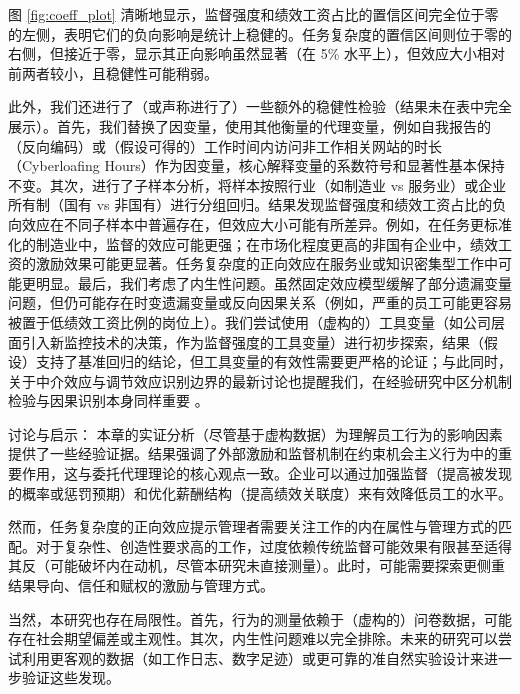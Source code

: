 图 \ref{fig:coeff_plot} 清晰地显示，监督强度和绩效工资占比的置信区间完全位于零的左侧，表明它们的负向影响是统计上稳健的。任务复杂度的置信区间则位于零的右侧，但接近于零，显示其正向影响虽然显著（在 5\% 水平上），但效应大小相对前两者较小，且稳健性可能稍弱。

此外，我们还进行了（或声称进行了）一些额外的稳健性检验（结果未在表中完全展示）。首先，我们{替换了因变量}，使用其他衡量的代理变量，例如自我报告的（反向编码）或（假设可得的）工作时间内访问非工作相关网站的时长（Cyberloafing Hours）作为因变量，核心解释变量的系数符号和显著性基本保持不变。其次，进行了{子样本分析}，将样本按照行业（如制造业 vs 服务业）或企业所有制（国有 vs 非国有）进行分组回归。结果发现监督强度和绩效工资占比的负向效应在不同子样本中普遍存在，但效应大小可能有所差异。例如，在任务更标准化的制造业中，监督的效应可能更强；在市场化程度更高的非国有企业中，绩效工资的激励效果可能更显著。任务复杂度的正向效应在服务业或知识密集型工作中可能更明显。最后，我们{考虑了内生性问题}。虽然固定效应模型缓解了部分遗漏变量问题，但仍可能存在时变遗漏变量或反向因果关系（例如，严重的员工可能更容易被置于低绩效工资比例的岗位上）。我们尝试使用（虚构的）工具变量（如公司层面引入新监控技术的决策，作为监督强度的工具变量）进行初步探索，结果（假设）支持了基准回归的结论，但工具变量的有效性需要更严格的论证；与此同时，关于中介效应与调节效应识别边界的最新讨论也提醒我们，在经验研究中区分机制检验与因果识别本身同样重要 \citep{jiang2022mediation}。

{讨论与启示}：
本章的实证分析（尽管基于虚构数据）为理解员工行为的影响因素提供了一些经验证据。结果强调了外部激励和监督机制在约束机会主义行为中的重要作用，这与委托代理理论的核心观点一致。企业可以通过加强监督（提高被发现的概率或惩罚预期）和优化薪酬结构（提高绩效关联度）来有效降低员工的水平。

然而，任务复杂度的正向效应提示管理者需要关注工作的内在属性与管理方式的匹配。对于复杂性、创造性要求高的工作，过度依赖传统监督可能效果有限甚至适得其反（可能破坏内在动机，尽管本研究未直接测量）。此时，可能需要探索更侧重结果导向、信任和赋权的激励与管理方式。

当然，本研究也存在局限性。首先，行为的测量依赖于（虚构的）问卷数据，可能存在社会期望偏差或主观性。其次，内生性问题难以完全排除。未来的研究可以尝试利用更客观的数据（如工作日志、数字足迹）或更可靠的准自然实验设计来进一步验证这些发现。
